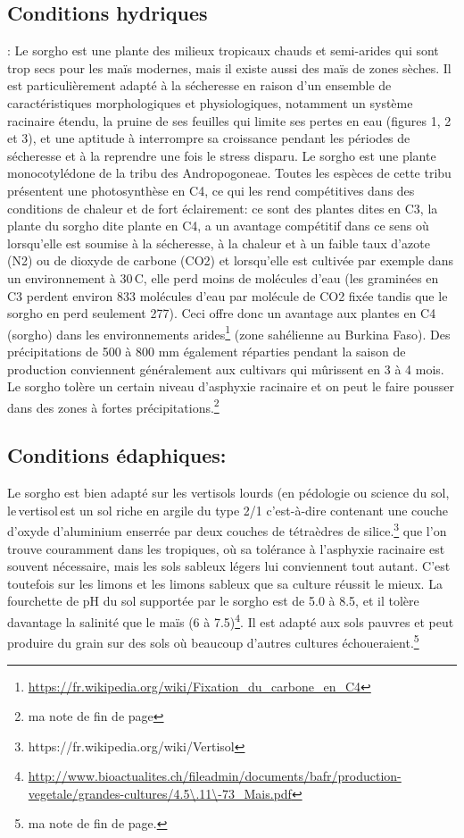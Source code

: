 \documentclass[a4paper,11pt]{article}
\begin{document}
 \subsection{ Conditions hydriques}:
 Le sorgho est une plante des milieux tropicaux chauds et semi-arides
 qui sont trop secs pour les maïs modernes, mais il existe aussi des
 maïs de zones sèches. Il est particulièrement adapté à la sécheresse
 en raison d’un ensemble de caractéristiques morphologiques et
 physiologiques, notamment un système racinaire étendu, la pruine de
 ses feuilles qui limite ses pertes en eau (figures 1, 2 et 3), et une
 aptitude à interrompre sa croissance pendant les périodes de
 sécheresse et à la reprendre une fois le stress disparu. Le sorgho
 est une plante monocotylédone de la tribu des Andropogoneae. Toutes
 les espèces de cette tribu présentent une photosynthèse en C4, ce qui
 les rend compétitives dans des conditions de chaleur et de fort
 éclairement: ce sont des plantes dites en C3, la plante du sorgho
 dite plante en C4, a un avantage compétitif dans ce sens
 où\,lorsqu’elle est soumise à la sécheresse, à la chaleur et à un
 faible taux d’azote (N2) ou de dioxyde de carbone (CO2) et
 lorsqu’elle est cultivée par exemple dans un environnement à
 30\,\degree{}C, elle perd moins de molécules d’eau (les graminées en
 C3 perdent environ 833 molécules d’eau par molécule de CO2 fixée
 tandis que le sorgho en perd seulement 277). Ceci offre donc un
 avantage aux plantes en C4 (sorgho) dans les environnements
 arides\footnote{\url{https://fr.wikipedia.org/wiki/Fixation_du_carbone_en_C4}}
 (zone sahélienne au Burkina Faso). Des précipitations de 500 à 800 mm
 également réparties pendant la saison de production conviennent
 généralement aux cultivars qui mûrissent en 3 à 4 mois. Le sorgho
 tolère un certain niveau d’asphyxie racinaire et on peut le faire
 pousser dans des zones à fortes précipitations.\footnote{ma note de
   fin de page}

 
 \subsection{Conditions édaphiques:} Le sorgho est bien adapté sur
 les vertisols lourds (en pédologie ou science du sol,
 le\,vertisol\,est un sol riche en argile du type 2/1 c’est-à-dire
 contenant une couche d’oxyde d’aluminium enserrée par deux couches de
 tétraèdres de
 silice.\footnote{https://fr.wikipedia.org/wiki/Vertisol} que l’on
 trouve couramment dans les tropiques, où sa tolérance à l’asphyxie
 racinaire est souvent nécessaire, mais les sols sableux légers lui
 conviennent tout autant. C’est toutefois sur les limons et les limons
 sableux que sa culture réussit le mieux. La fourchette de pH du sol
 supportée par le sorgho est de 5.0 à 8.5, et il tolère davantage la
 salinité que le maïs (6
 à 7.5)\footnote{\url{http://www.bioactualites.ch/fileadmin/documents/bafr/production-vegetale/grandes-cultures/4.5\.11\-73_Mais.pdf}}. Il est adapté aux sols pauvres et peut produire du grain sur des sols où beaucoup d’autres cultures échoueraient.\footnote{ma note de fin de page.}
\end{document}

